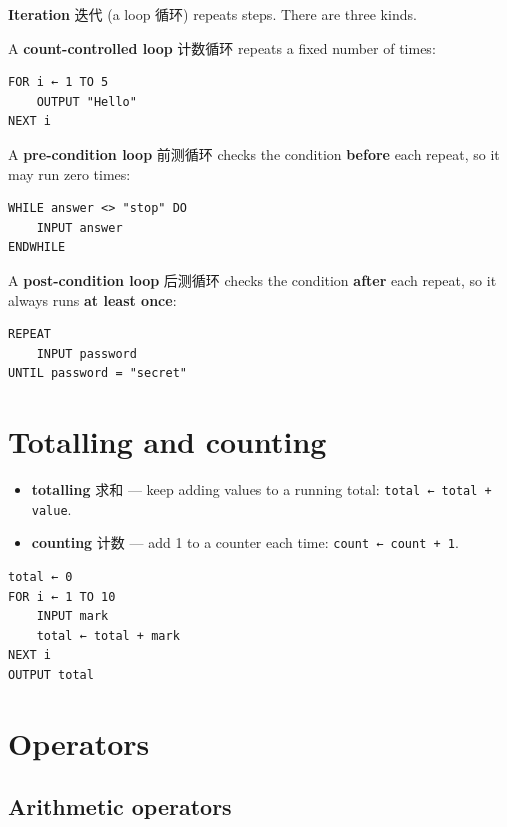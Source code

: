 \documentclass[11pt]{article}
\begin{document}
\textbf{Iteration} 迭代 (a loop 循环) repeats steps. There are three kinds.

A \textbf{count-controlled loop} 计数循环 repeats a fixed number of times:

\begin{Verbatim}
FOR i ← 1 TO 5
    OUTPUT "Hello"
NEXT i
\end{Verbatim}

A \textbf{pre-condition loop} 前测循环 checks the condition \textbf{before} each repeat, so it may run zero times:

\begin{Verbatim}
WHILE answer <> "stop" DO
    INPUT answer
ENDWHILE
\end{Verbatim}

A \textbf{post-condition loop} 后测循环 checks the condition \textbf{after} each repeat, so it always runs \textbf{at least once}:

\begin{Verbatim}
REPEAT
    INPUT password
UNTIL password = "secret"
\end{Verbatim}

\section*{Totalling and counting}

\begin{itemize}
\item \textbf{totalling} 求和 — keep adding values to a running total: \texttt{total ← total + value}.

\item \textbf{counting} 计数 — add 1 to a counter each time: \texttt{count ← count + 1}.

\end{itemize}

\begin{Verbatim}
total ← 0
FOR i ← 1 TO 10
    INPUT mark
    total ← total + mark
NEXT i
OUTPUT total
\end{Verbatim}

\section*{Operators}

\subsection*{Arithmetic operators}
\end{document}
